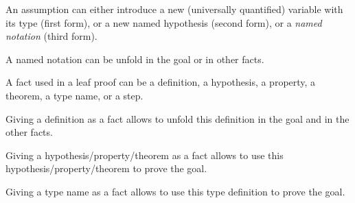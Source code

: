 An assumption can either introduce a new (universally quantified)
variable with its type (first form), or a new named hypothesis (second
form), or a {\em named notation} (third form).

A named notation can be unfold in the goal or in other facts.

\begin{syn}
 \is
\alt {}
\alt {}
\alt {}
\alt {}
\end{syn}


A fact used in a leaf proof can be a definition, a hypothesis, a
property, a theorem, a type name, or a step.

Giving a definition as a fact allows {\zenon} to unfold this
definition in the goal and in the other facts.

Giving a hypothesis/property/theorem as a fact allows {\zenon} to use
this hypothesis/property/theorem to prove the goal.

Giving a type name as a fact allows {\zenon} to use this type definition to
prove the goal.

